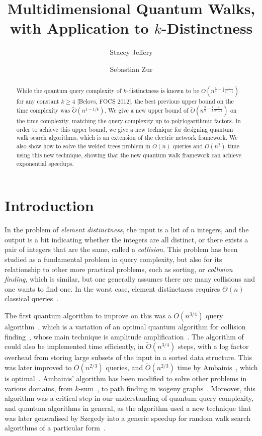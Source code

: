 \documentclass{article}
\author{Stacey Jeffery \and Sebastian Zur}\date{}
\title{Multidimensional Quantum Walks, with Application to \texorpdfstring{$k$}{k}-Distinctness}
\renewcommand{\>}{\rangle}
\newcommand{\<}{\langle}
\renewcommand{\(}{\left(}
\renewcommand{\)}{\right)}
\begin{document}
\maketitle

\begin{abstract}
While the quantum query complexity of $k$-distinctness is known to be $O(n^{\frac{3}{4}-\frac{1}{4}\frac{1}{2^k-1}})$ for any constant $k\geq 4$ [Belovs, FOCS 2012], the best previous upper bound on the time complexity was $\widetilde{O}(n^{1-1/k})$. We give a new upper bound of $\widetilde{O}(n^{\frac{3}{4}-\frac{1}{4}\frac{1}{2^k-1}})$ on the time complexity, matching the query complexity up to polylogarithmic factors. In order to achieve this upper bound, we give a new technique for designing quantum walk search algorithms, which is an extension of the electric network framework. We also show how to solve the welded trees problem in $O(n)$ queries and $O(n^2)$ time using this new technique, showing that the new quantum walk framework can achieve exponential speedups.  
\end{abstract}

 

\section{Introduction}

In the problem of \emph{element distinctness}, the input is a list of $n$ integers, and the output is a bit indicating whether the integers are all distinct, or there exists a pair of integers that are the same, called a \emph{collision}. This problem has been studied as a fundamental problem in query complexity, but also for its relationship to other more practical problems, such as sorting, or \emph{collision finding}, which is similar, but one generally assumes there are many collisions and one wants to find one. In the worst case, element distinctness requires $\Theta(n)$ classical queries~\cite{ajtai2005EDlowerbound}. 

The first quantum algorithm to improve on this was a $O(n^{3/4})$ query algorithm~\cite{buhrman2001ElementDistinctness}, which is a variation of an optimal quantum algorithm for collision finding~\cite{brassard1997collision}, whose main technique is amplitude amplification~\cite{brassard2002AmpAndEst}. The algorithm of~\cite{buhrman2001ElementDistinctness} could also be implemented time efficiently, in $\widetilde{O}(n^{3/4})$ steps, with a log factor overhead from storing large subsets of the input in a sorted data structure. This was later improved to $O(n^{2/3})$ queries, and $\widetilde{O}(n^{2/3})$ time by Ambainis~\cite{ambainis2004QWalkForElementDist}, which is optimal~\cite{aaronson2004QLowerBndCollisionAndElementDistinct}. Ambainis' algorithm has been modified to solve other problems in various domains, from $k$-sum~\cite{childs2005quantum}, to path finding in isogeny graphs~\cite{tani2009claw,
costello2016isogeny}. Moreover, this algorithm was a critical step in our understanding of quantum query complexity, and quantum algorithms in general, as the algorithm used a new technique that was later generalised by Szegedy into a generic speedup for random walk search algorithms of a particular form~\cite{szegedy2004QMarkovChainSearch}. 
\end{document}
